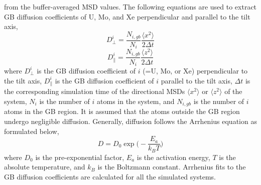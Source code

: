 \documentclass{elsarticle}
\providecommand{\DIFadd}[1]{{\protect\color{blue} \sf #1}} %
\providecommand{\DIFdel}[1]{}
\providecommand{\DIFaddbegin}{} %
\providecommand{\DIFaddend}{} %
\providecommand{\DIFdelbegin}{} %
\providecommand{\DIFdelend}{} %
\begin{document}
\DIFdelend \DIFaddbegin \DIFadd{from the buffer-averaged MSD values. The following equations are used to extract GB diffusion coefficients of U, Mo, and Xe perpendicular and parallel to the tilt axis,
}\begin{equation}
	D^i_{\perp} = \frac{N_{i, gb}}{N_i} \frac{\langle x^2 \rangle}{2 \Delta t}
\end{equation}\DIFaddend 
\DIFdelbegin \DIFdel{where $\xi$ is the dimensionality of the diffusion and $\langle r^2 \rangle_{GB}$ is the MSD of the }\DIFdelend \DIFaddbegin \begin{equation}
	D^i_{\parallel} = \frac{N_{i, gb}}{N_i} \frac{\langle z^2 \rangle}{2 \Delta t}
\end{equation}
\DIFadd{where $D^i_{\perp}$ is the GB diffusion coefficient of $i$ (=U, Mo, or Xe) perpendicular to the tilt axis, $D^i_{\parallel}$ is the GB diffusion coefficient of $i$ parallel to the tilt axis, $\Delta t$ is the corresponding simulation time of the directional MSDs $\langle x^2 \rangle$ or $\langle z^2 \rangle$ of the system, $N_i$ is the number of $i$ }\DIFaddend atoms in the \DIFdelbegin \DIFdel{GB}\DIFdelend \DIFaddbegin \DIFadd{system, and $N_{i, gb}$ is the number of $i$ atoms in the GB region. It is assumed that the atoms outside the GB region undergo negligible diffusion}\DIFaddend . \DIFdelbegin \DIFdel{The diffusion coefficients for all the aforementioned systems are calculated using this equation. Since the studied systems are two-dimensional GBs, the dimensionality is $\xi=2$. }\DIFdelend Generally, diffusion follows the Arrhenius equation as formulated \DIFdelbegin \DIFdel{in Eq. \ref{eq:arrD}:
}%
\DIFdelend \DIFaddbegin \DIFadd{below,
}\begin{equation}
	D = D_0 \exp \bigg( -\frac{E_a}{k_B T} \bigg)
\end{equation}\DIFaddend 
where $D_0$ is the pre-exponential factor, $E_a$ is the activation energy, $T$ is the absolute temperature, and $k_B$ is the Boltzmann constant. Arrhenius fits \DIFdelbegin \DIFdel{are calculated for the diffusion coefficients of }\DIFdelend \DIFaddbegin \DIFadd{to the GB diffusion coefficients are calculated for }\DIFaddend all the simulated systems.
\end{document}
